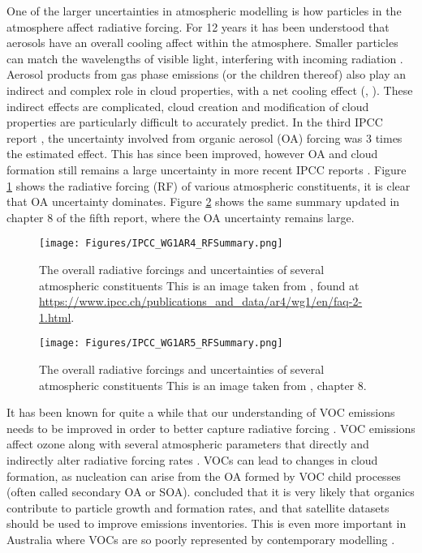     One of the larger uncertainties in atmospheric modelling is how particles in the atmosphere affect radiative forcing.
    For 12 years it has been understood that aerosols have an overall cooling affect within the atmosphere.
    Smaller particles can match the wavelengths of visible light, interfering with incoming radiation \parencite{Kanakidou2005}.
    Aerosol products from gas phase emissions (or the children thereof) also play an indirect and complex role in cloud properties, with a net cooling effect (\textcite{Kanakidou2005}, \textcite[Chapter 7,8]{IPCC_AR5_WG1}).
    These indirect effects are complicated, cloud creation and modification of cloud properties are particularly difficult to accurately predict.
    In the third IPCC report \parencite{IPCC2001}, the uncertainty involved from organic aerosol (OA) forcing was 3 times the estimated effect.
    This has since been improved, however OA and cloud formation still remains a large uncertainty in more recent IPCC reports \parencite{IPCC_Chapter2}.
    Figure \ref{LR:VOCs:IsopCascade:RF:fig_IPCC_RF_AR4} shows the radiative forcing (RF) of various atmospheric constituents, it is clear that OA uncertainty dominates.
    Figure \ref{LR:VOCs:IsopCascade:RF:fig_IPCC_RF_AR5} shows the same summary updated in chapter 8 of the fifth report, where the OA uncertainty remains large.
    
    \begin{figure}
      \texttt{[image: Figures/IPCC\_WG1AR4\_RFSummary.png]}
      \caption{%
        The overall radiative forcings and uncertainties of several atmospheric constituents
        This is an image taken from \textcite{IPCC_Chapter2}, found at \url{https://www.ipcc.ch/publications_and_data/ar4/wg1/en/faq-2-1.html}.}
     \label{LR:VOCs:IsopCascade:RF:fig_IPCC_RF_AR4}
    \end{figure}
    
    \begin{figure}
      \texttt{[image: Figures/IPCC\_WG1AR5\_RFSummary.png]}
      \caption{%
        The overall radiative forcings and uncertainties of several atmospheric constituents
        This is an image taken from \textcite{IPCC_AR5_WG1}, chapter 8.}
      \label{LR:VOCs:IsopCascade:RF:fig_IPCC_RF_AR5}
    \end{figure}    
    
    It has been known for quite a while that our understanding of VOC emissions needs to be improved in order to better capture radiative forcing \parencite{Kanakidou2005}.
    VOC emissions affect ozone along with several atmospheric parameters that directly and indirectly alter radiative forcing rates \parencite[e.g.][]{Arneth2008}.
    VOCs can lead to changes in cloud formation, as nucleation can arise from the OA formed by VOC child processes (often called secondary OA or SOA).
    \textcite{Kanakidou2005} concluded that it is very likely that organics contribute to particle growth and formation rates, and that satellite datasets should be used to improve emissions inventories.
    This is even more important in Australia where VOCs are so poorly represented by contemporary modelling \parencite{Emmerson2016}.

